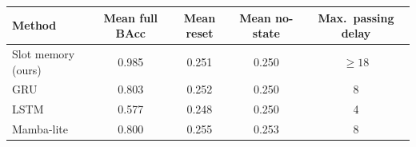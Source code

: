 \begin{tabular}{lcccc}
\toprule
Method & Mean full BAcc & Mean reset & Mean no-state & Max.\ passing delay\\
\midrule
\rowcolor{MemCream}Slot memory (ours) & 0.985 & 0.251 & 0.250 & $\ge 18$\\
GRU & 0.803 & 0.252 & 0.250 & 8\\
LSTM & 0.577 & 0.248 & 0.250 & 4\\
Mamba-lite & 0.800 & 0.255 & 0.253 & 8\\
\bottomrule
\end{tabular}
